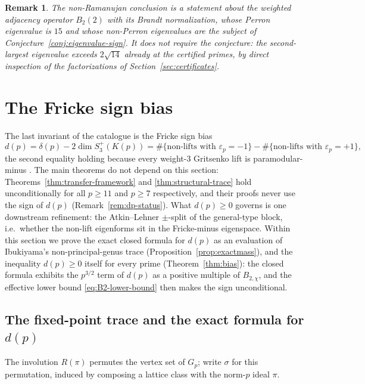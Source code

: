 \documentclass[10pt,a4paper]{amsart}
\newtheorem{remark}[theorem]{Remark}
\newcommand{\eps}{\varepsilon}
\begin{document}
	\begin{remark}\label{rem:nonramanujan}
		The non-Ramanujan conclusion is a statement about the weighted adjacency
		operator $B_2(2)$ with its Brandt normalization, whose Perron eigenvalue
		is $15$ and whose non-Perron eigenvalues are the subject of
		Conjecture~\ref{conj:eigenvalue-sign}. It does not require the conjecture:
		the second-largest eigenvalue exceeds $2\sqrt{14}$ already at the
		certified primes, by direct inspection of the factorizations of
		Section~\ref{sec:certificates}.
	\end{remark}
	
	\section{The Fricke sign bias}
	\label{sec:signbias}
	
	The last invariant of the catalogue is the Fricke sign bias
	\begin{equation}\label{eq:dp-def}
		d(p)=\delta(p)-2\dim S_3^+(K(p))
		=\#\{\text{non-lifts with }\eps_p=-1\}
		-\#\{\text{non-lifts with }\eps_p=+1\},
	\end{equation}
	the second equality holding because every weight-$3$ Gritsenko lift \cite{Gritsenko1995} is
	paramodular-minus \cite{IPY2013}. The main theorems do not depend on this
	section: Theorems~\ref{thm:transfer-framework} and
	\ref{thm:structural-trace} hold unconditionally for all $p\ge11$ and
	$p\ge7$ respectively, and their proofs never use the sign of
	$d(p)$ (Remark~\ref{rem:dp-status}). What $d(p)\ge0$ governs is one
	downstream refinement: the Atkin--Lehner $\pm$-split of the general-type
	block, i.e.\ whether the non-lift eigenforms sit in the Fricke-minus
	eigenspace. Within this section we prove the exact closed formula for $d(p)$ as an
	evaluation of Ibukiyama's non-principal-genus trace (Proposition~\ref{prop:exactmass}), and
	the inequality $d(p)\ge0$ itself for every prime (Theorem~\ref{thm:bias}): the closed
	formula exhibits the $p^{3/2}$ term of $d(p)$ as a positive multiple of
	$B_{2,\chi}$, and the effective lower bound \eqref{eq:B2-lower-bound} then
	makes the sign unconditional.
	
	\subsection{The fixed-point trace and the exact formula for $d(p)$}
	\label{ss:mass}
	
	The involution $R(\pi)$ permutes the vertex set of $G_p$; write $\sigma$
	for this permutation, induced by composing a lattice class with the
	norm-$p$ ideal $\pi$.
	
\end{document}
